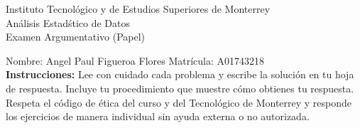\documentclass[10pt]{report}
\begin{document}
\newpage



\begin{center}
{\large Instituto Tecnol\'{o}gico y de Estudios Superiores de Monterrey \\
An\'alisis Estad\'stico de Datos } \\
Examen Argumentativo (Papel)
\end{center}

Nombre: \underline{\hspace*{.2in}}
Angel Paul Figueroa Flores
\underline{\hspace*{.2in}} \quad Matr\'icula:\underline{\hspace*{.2in}}
A01743218
\underline{\hspace*{.2in}} \\

{\bf Instrucciones:} Lee con cuidado cada problema y escribe la soluci\'on
en tu hoja de respuesta. Incluye tu procedimiento que muestre c\'omo obtienes tu respuesta.  Respeta el c\'odigo de \'etica del curso y del Tecnol\'ogico de Monterrey y responde los ejercicios de manera individual sin ayuda externa o no autorizada.
\end{document}
